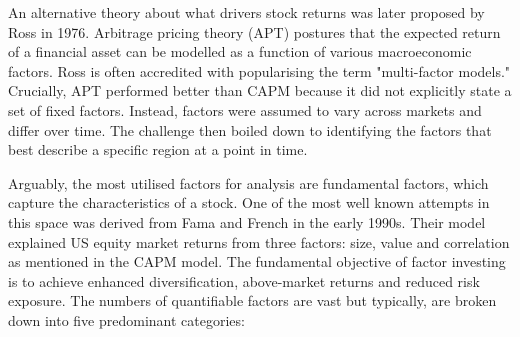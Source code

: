 \documentclass[10pt,onecolumn,letterpaper]{article}
\begin{document}
An alternative theory\cite{Ross} about what drivers stock returns was later proposed by Ross in 1976. Arbitrage pricing theory (APT) postures that the expected return of a financial asset can be modelled as a function of various macroeconomic factors. Ross is often accredited with popularising the term "multi-factor models." Crucially, APT performed better than CAPM because it did not explicitly state a set of fixed factors. Instead, factors were assumed to vary across markets and differ over time. The challenge then boiled down to identifying the factors that best describe a specific region at a point in time. 

Arguably, the most utilised factors for analysis are fundamental factors, which capture the characteristics of a stock. One of the most well known attempts in this space was derived from Fama and French in the early 1990s. Their model\cite{Fama} explained US equity market returns from three factors: size, value and correlation as mentioned in the CAPM model. The fundamental objective of factor investing is to achieve enhanced diversification, above-market returns and reduced risk exposure. The numbers of quantifiable factors are vast but typically, are broken down into five predominant categories: 
\end{document}

